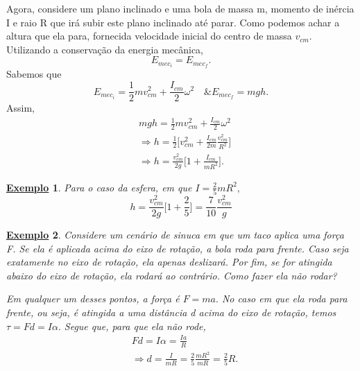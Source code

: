 \documentclass{article}
\newtheorem{example}{\underline{Exemplo}}
\begin{document}
  Agora, considere um plano inclinado e uma bola de massa m, momento de inércia I e raio R que irá subir este plano inclinado até parar. Como podemos achar a altura que ela para, 
fornecida velocidade inicial do centro de massa \(v_{cm}\). Utilizando a conservação da energia mecânica, 
  \[
    E_{mec_{i}} = E_{mec_{f}}.
  \]
  Sabemos que 
    \[
      E_{mec_{i}} = \frac{1}{2}mv_{cm}^{2} + \frac{I_{cm}}{2}\omega ^{2}\quad \& E_{mec_{f}} = mgh.
    \]
  Assim, 
  \begin{align*}
    &mgh = \frac{1}{2} mv_{cm}^{2} + \frac{I_{cm}}{2}\omega^{2}\\
    &\Rightarrow h = \frac{1}{2}\biggl[v_{cm}^{2} + \frac{I_{cm}}{2m}\frac{v_{cm}^{2}}{R^{2}}\biggr]\\
    &\Rightarrow h = \frac{v_{cm}^{2}}{2g}\biggl[1 + \frac{I_{cm}}{mR^{2}}\biggr].
  \end{align*}
 \begin{example}
   Para o caso da esfera, em que \(I = \frac{2}{5}mR^{2},\) 
     \[
       h = \frac{v_{cm}^{2}}{2g}\biggl[1 + \frac{2}{5}\biggr] = \frac{7}{10}\frac{v_{cm}^{2}}{g}
     \]
 \end{example}
\begin{example}
  Considere um cenário de sinuca em que um taco aplica uma força F. Se ela é aplicada acima do eixo de rotação, a bola roda para frente. Caso seja exatamente no eixo de rotação,
ela apenas deslizará. Por fim, se for atingida abaixo do eixo de rotação, ela rodará ao contrário. Como fazer ela não rodar?

  Em qualquer um desses pontos, a força é \(F=ma.\) No caso em que ela roda para frente, ou seja, é atingida a uma distância d acima do eixo de rotação,
temos \(\tau = Fd = I\alpha.\) Segue que, para que ela não rode, 
\begin{align*}
  & Fd = I\alpha = \frac{Ia}{R}\\
  &\Rightarrow d = \frac{I}{mR} = \frac{2}{5}\frac{mR^{2}}{mR} = \frac{2}{5}R.
\end{align*}
\end{example}
\end{document}
